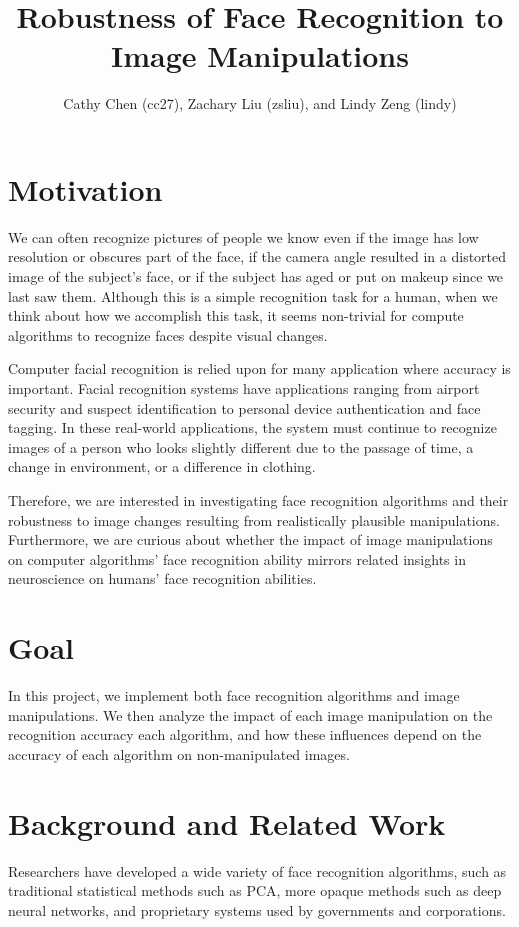 \documentclass[pageno]{cos429}
\begin{document}
\title{Robustness of Face Recognition to Image Manipulations}

\author{Cathy Chen (cc27), Zachary Liu (zsliu), and Lindy Zeng (lindy)}
\date{}
\maketitle

\section{Motivation}
We can often recognize pictures of people we know even if the image has low resolution or obscures part of the face, if the camera angle resulted in a distorted image of the subject's face, or if the subject has aged or put on makeup since we last saw them. Although this is a simple recognition task for a human, when we think about how we accomplish this task, it seems non-trivial for compute algorithms to recognize faces despite visual changes.

Computer facial recognition is relied upon for many application where accuracy is important. Facial recognition systems have applications ranging from airport security and suspect identification to personal device authentication and face tagging\cite{huang_face_2011}. In these real-world applications, the system must continue to recognize images of a person who looks slightly different due to the passage of time, a change in environment, or a difference in clothing.

Therefore, we are interested in investigating face recognition algorithms and their robustness to image changes resulting from realistically plausible manipulations. Furthermore, we are curious about whether the impact of image manipulations on computer algorithms' face recognition ability mirrors related insights in neuroscience on humans' face recognition abilities.

\section{Goal}
In this project, we implement both face recognition algorithms and image manipulations. We then analyze the impact of each image manipulation on the recognition accuracy each algorithm, and how these influences depend on the accuracy of each algorithm on non-manipulated images.

\section{Background and Related Work}
Researchers have developed a wide variety of face recognition algorithms, such as traditional statistical methods such as PCA, more opaque methods such as deep neural networks, and proprietary systems used by governments and corporations\cite{noauthor_face_nodate}\cite{schroff_facenet:_2015}\cite{sun_meet_2017}.
\end{document}
